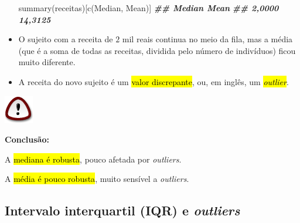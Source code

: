 \documentclass[
  11pt]{report}
\newenvironment{Shaded}{\begin{snugshade}}{\end{snugshade}}
\newcommand{\DocumentationTok}[1]{\textcolor[rgb]{0.56,0.35,0.01}{\textbf{\textit{#1}}}}
\newcommand{\FunctionTok}[1]{\textcolor[rgb]{0.00,0.00,0.00}{#1}}
\newcommand{\NormalTok}[1]{#1}
\newcommand{\StringTok}[1]{\textcolor[rgb]{0.31,0.60,0.02}{#1}}
\newenvironment{rmdimportant}
{
  \begin{myimportant}
    \includegraphics{images/important.png}
    \tcblower
  }
  {
  \end{myimportant}
}
\renewenvironment{Shaded}{
    \begin{mdframed}[%
      roundcorner=2pt,%
      innerleftmargin=5pt,%
      innerrightmargin=5pt,%
      topline=true,%
      leftline=true,%
      rightline=true,%
      bottomline=true,%
      linewidth=0.5pt,%
      linecolor=black!20,%
      backgroundcolor=black!2,%
      skipabove=2ex,%
      skipbelow=2.5ex%
    ]%
  }
  {
    \end{mdframed}
  }
\begin{document}
\begin{itemize}
\begin{Shaded}
\begin{Highlighting}[]
\FunctionTok{summary}\NormalTok{(receitas)[}\FunctionTok{c}\NormalTok{(}\StringTok{\textquotesingle{}Median\textquotesingle{}}\NormalTok{, }\StringTok{\textquotesingle{}Mean\textquotesingle{}}\NormalTok{)]}
\DocumentationTok{\#\#  Median    Mean }
\DocumentationTok{\#\#  2,0000 14,3125}
\end{Highlighting}
\end{Shaded}
\item
  O sujeito com a receita de $2$ mil reais continua no meio da fila, mas a média (que é a soma de todas as receitas, dividida pelo número de indivíduos) ficou muito diferente.
\item
  A receita do novo sujeito é um {\hl{valor discrepante}}, ou, em inglês, um {\hl{\emph{outlier}}}.
\end{itemize}

\begin{rmdimportant}
\textbf{Conclusão:}

A {\hl{mediana é robusta}}, pouco afetada por \emph{outliers}.

A {\hl{média é pouco robusta}}, muito sensível a \emph{outliers}.

\end{rmdimportant}

\hypertarget{intervalo-interquartil-iqr-e-outliers}{%
\subsection{\texorpdfstring{Intervalo interquartil (IQR) e \emph{outliers}}{Intervalo interquartil (IQR) e outliers}}\label{intervalo-interquartil-iqr-e-outliers}}
\end{document}
